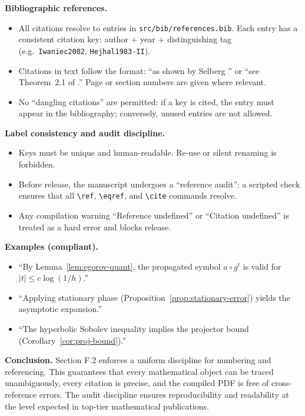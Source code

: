 \medskip
\noindent \textbf{Bibliographic references.}
\begin{itemize}
  \item All citations resolve to entries in \texttt{src/bib/references.bib}. Each entry has a consistent citation key: author + year + distinguishing tag (e.g.\ \texttt{Iwaniec2002}, \texttt{Hejhal1983-II}).
  \item Citations in text follow the format: “as shown by Selberg \cite{Selberg1956}” or “see Theorem~2.1 of \cite{Iwaniec2002}.” Page or section numbers are given where relevant.
  \item No “dangling citations” are permitted: if a key is cited, the entry must appear in the bibliography; conversely, unused entries are not allowed.
\end{itemize}

\medskip
\noindent \textbf{Label consistency and audit discipline.}
\begin{itemize}
  \item Keys must be unique and human-readable. Re-use or silent renaming is forbidden.
  \item Before release, the manuscript undergoes a “reference audit”: a scripted check ensures that all \verb|\ref|, \verb|\eqref|, and \verb|\cite| commands resolve.
  \item Any compilation warning “Reference undefined” or “Citation undefined” is treated as a hard error and blocks release.
\end{itemize}

\medskip
\noindent \textbf{Examples (compliant).}
\begin{itemize}
  \item “By Lemma~\ref{lem:egorov-quant}, the propagated symbol \(a\circ g^t\) is valid for \(|t|\leq c\log(1/h)\).”
  \item “Applying stationary phase (Proposition~\ref{prop:stationary-error}) yields the asymptotic expansion.”
  \item “The hyperbolic Sobolev inequality \cite[Thm.~2.1]{Iwaniec2002} implies the projector bound (Corollary~\ref{cor:proj-bound}).”
\end{itemize}

\medskip
\noindent \textbf{Conclusion.}
Section F.2 enforces a uniform discipline for numbering and referencing. This guarantees that every mathematical object can be traced unambiguously, every citation is precise, and the compiled PDF is free of cross-reference errors. The audit discipline ensures reproducibility and readability at the level expected in top-tier mathematical publications.


